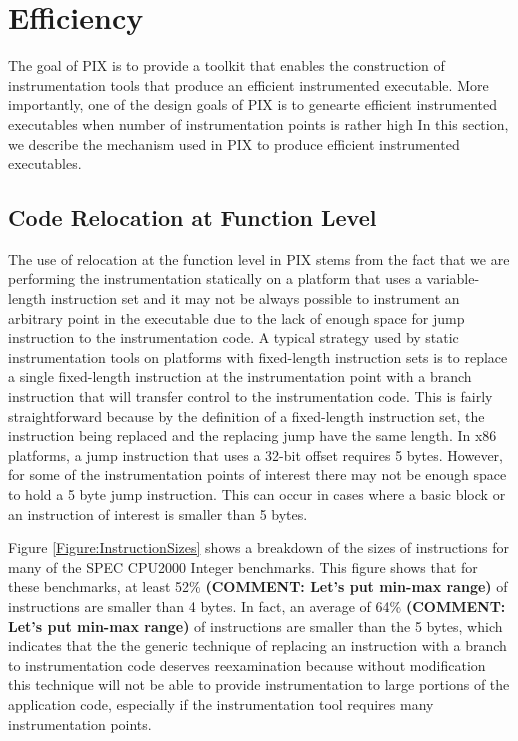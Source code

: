 \section{Efficiency}

The goal of PIX is to provide a toolkit that enables the construction of
instrumentation tools that produce an efficient instrumented
executable. More importantly, one of the design goals of PIX is to genearte efficient instrumented executables
when number of instrumentation points is rather high  In this section, we describe the mechanism used in PIX 
to produce efficient instrumented executables.

\label{Subsection:Relocation}
\subsection{Code Relocation at Function Level}
The use of relocation at the function level in PIX stems from the fact
that we are performing the instrumentation statically on a platform that uses a
variable-length instruction set and it may not be always possible to instrument
an arbitrary point in the executable due to the lack of enough space for jump instruction to the instrumentation code. 
A typical strategy used by static
instrumentation tools on platforms with fixed-length instruction sets is to
replace a single fixed-length instruction at the instrumentation point with a
branch instruction that will transfer control to the instrumentation code. This is fairly straightforward because by the
definition of a fixed-length instruction set, the instruction being replaced and
the replacing jump have the same length. 
In x86 platforms, a
jump instruction that uses a 32-bit offset requires 5 bytes. However, for some of
the instrumentation points of interest there may not be enough space to hold a 5 byte
jump instruction. This can occur in cases where a basic block or an instruction of interest
is smaller than 5 bytes. 

Figure \ref{Figure:InstructionSizes} shows a breakdown of the sizes of
instructions for many of the SPEC CPU2000 Integer benchmarks. This figure shows that for these benchmarks,
at least 52\% \textbf{(COMMENT: Let's put min-max range)} of instructions are smaller than 4 bytes. In fact, an average of 64\% \textbf{(COMMENT: Let's put min-max range)} of instructions
are smaller than the 5 bytes, which indicates that the the generic technique of replacing 
an instruction with a branch to instrumentation code deserves reexamination because without modification
this technique will not be able to provide instrumentation to large portions of the application code, especially 
if the instrumentation tool requires many instrumentation points.

